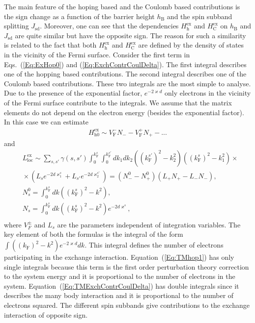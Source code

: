 \documentclass[aps,prb,amsmath,amssymb,twocolumn,superscriptaddress,showpacs,floatfix]{revtex4-1}
\begin{document}
The main feature of the hoping based and the Coulomb based contributions
is the sign change as a function of the barrier height $h_\mathrm B$ and the
spin subband splitting $J_\mathrm{sd}$. Moreover, one can see that the dependencies $H^\mathrm{ex}_\mathrm{h}$ and $H^\mathrm{ex}_\mathrm{C}$ on $h_\mathrm B$ and $J_\mathrm{sd}$ are quite similar but have the
opposite sign. The reason for such a similarity is related to the fact that
both $H^\mathrm{ex}_\mathrm{h}$ and $H^\mathrm{ex}_\mathrm{C}$ are defined by the density of
states in the vicinity of the Fermi surface. Consider the first term in
Eqs.~(\ref{Eq:ExHop0}) and (\ref{Eq:ExchContrCoulDelta}). The first integral
describes one of the hopping based contributions.
The second integral describes one of the Coulomb based contributions.
These two integrals are the most simple to analyse.
Due to the presence of the exponential factor, $e^{-2\varkappa d}$
only electrons in the vicinity of the Fermi surface contribute to
the integrals. We assume that the matrix elements do not depend on the electron energy
(besides the exponential factor). In this case we can estimate
\begin{equation}\label{Eq:TMhop1}
\begin{split}
H^{\mathrm{ex}}_{\mathrm{h0}}\!\sim\!\!V^-_{\mathrm F}\!\!N_--V^+_{\mathrm F}N_+-...
\end{split}
\end{equation}
and
\begin{equation}\label{Eq:TMExchContrCoulDelta}
\begin{split}
&L^\mathrm{ex}_{\mathrm{loc}}\sim\!\!\sum_{s,s'}\!\gamma(s,s')\!\!\int_0^{k_\mathrm F^s}\!\!\int_0^{k_\mathrm{F}^{s'}}\!\!\!\!\!dk_1 dk_2((k_\mathrm F^{s'})^2-k_2^2)((k_\mathrm F^s)^2-k_1^2)\times\\&\!\times\!(L_s e^{-2d\varkappa^s_{1}}\!+L_{s'}e^{-2d\varkappa^{s'}_{2}})=(N^0_-\! - \!N^0_+)(L_+ N_+\!-\!L_-N_-),\\
&N_s^0=\int_0^{k_\mathrm{F}^{s}}dk((k_\mathrm F^{s})^2-k^2),\\
&N_s=\int_0^{k_\mathrm{F}^{s}}dk((k_\mathrm F^{s})^2-k^2)e^{-2d\varkappa^s},\\
\end{split}
\end{equation}
where $V^{\pm}_F$ and $L_s$ are the parameters independent of integration variables. The key element of both the formulas is the integral of the form $\int ((k_\mathrm F)^2-k^2)e^{-2\varkappa d}dk$. This integral defines the number of electrons
participating in the exchange interaction. Equation~(\ref{Eq:TMhop1}) has only single integrals because this term is the first order perturbation theory correction to the system energy and it is proportional to the number of electrons in the system. Equation~(\ref{Eq:TMExchContrCoulDelta}) has double integrals since
it describes the many body interaction and it is proportional to the number
of electrons squared. The different spin subbands give contributions
to the exchange interaction of opposite sign.
\end{document}
